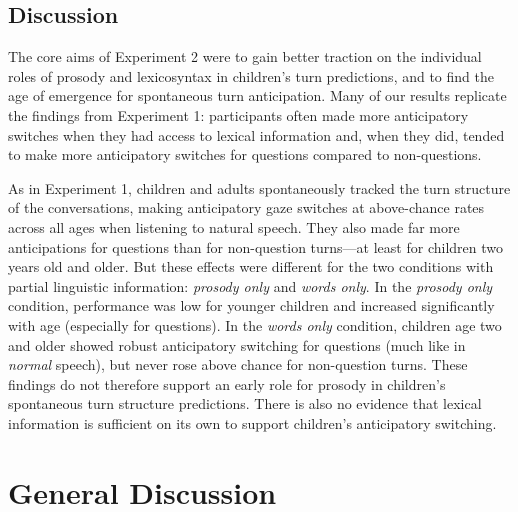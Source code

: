 \documentclass[authoryear, 12pt]{elsarticle}
\begin{document}
\subsection{Discussion}
\label{sec:discussion2}

The core aims of Experiment 2 were to gain better traction on the individual roles of prosody and lexicosyntax in children's turn predictions, and to find the age of emergence for spontaneous turn anticipation. Many of our results replicate the findings from Experiment 1: participants often made more anticipatory switches when they had access to lexical information and, when they did, tended to make more anticipatory switches for questions compared to non-questions. 

As in Experiment 1, children and adults spontaneously tracked the turn structure of the conversations, making anticipatory gaze switches at above-chance rates across all ages when listening to natural speech. They also made far more anticipations for questions than for non-question turns---at least for children two years old and older. But these effects were different for the two conditions with partial linguistic information: \textit{prosody only} and \textit{words only}. In the \textit{prosody only} condition, performance was low for younger children and increased significantly with age (especially for questions). In the \textit{words only} condition, children age two and older showed robust anticipatory switching for questions (much like in \textit{normal} speech), but never rose above chance for non-question turns. These findings do not therefore support an early role for prosody in children's spontaneous turn structure predictions. There is also no evidence that lexical information is sufficient on its own to support children's anticipatory switching.

\section{General Discussion}
\label{sec:gendisc}
\end{document}
